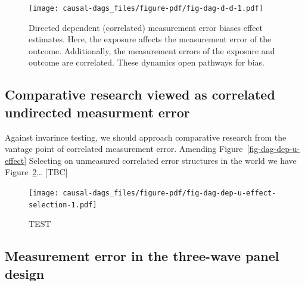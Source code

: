 \documentclass[
  singlecolumn]{report}
\begin{document}
\begin{figure}

{\centering \texttt{[image: causal-dags\_files/figure-pdf/fig-dag-d-d-1.pdf]}

}

\caption{\label{fig-dag-d-d}Directed dependent (correlated) measurement
error biases effect estimates. Here, the exposure affects the
measurement error of the outcome. Additionally, the measurement errors
of the exposure and outcome are correlated. These dynamics open pathways
for bias.}

\end{figure}

\hypertarget{comparative-research-viewed-as-correlated-undirected-measurment-error}{%
\subsection{Comparative research viewed as correlated undirected
measurment
error}\label{comparative-research-viewed-as-correlated-undirected-measurment-error}}

Against invarince testing, we should approach comparative research from
the vantage point of correlated measurement error. Amending
Figure~\ref{fig-dag-dep-u-effect} Selecting on unmeasured correlated
error structures in the world we have
Figure~\ref{fig-dag-dep-u-effect-selection}\ldots{} {[}TBC{]}

\begin{figure}

{\centering \texttt{[image: causal-dags\_files/figure-pdf/fig-dag-dep-u-effect-selection-1.pdf]}

}

\caption{\label{fig-dag-dep-u-effect-selection}TEST}

\end{figure}

\hypertarget{measurement-error-in-the-three-wave-panel-design}{%
\subsection{Measurement error in the three-wave panel
design}\label{measurement-error-in-the-three-wave-panel-design}}
\end{document}
